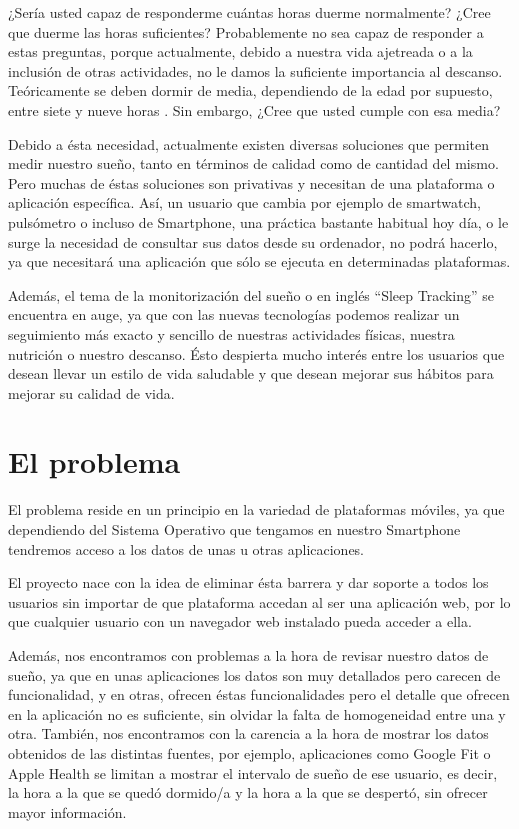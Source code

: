 \documentclass[11pt,openany]{book}
\begin{document}
¿Sería usted capaz de responderme cuántas horas duerme normalmente? ¿Cree que duerme las horas suficientes? Probablemente no sea capaz de responder a estas preguntas, porque actualmente, debido a nuestra vida ajetreada o a la inclusión de otras actividades, no le damos la suficiente importancia al descanso. Teóricamente se deben dormir de media, dependiendo de la edad por supuesto, entre siete y nueve horas \cite{1}. Sin embargo, ¿Cree que usted cumple con esa media?

Debido a ésta necesidad, actualmente existen diversas soluciones que permiten medir nuestro sueño, tanto en términos de calidad como de cantidad del mismo. Pero muchas de éstas soluciones son privativas y necesitan de una plataforma o aplicación específica. Así, un usuario que cambia por ejemplo de smartwatch, pulsómetro o incluso de Smartphone, una práctica bastante habitual hoy día, o le surge la necesidad de consultar sus datos desde su ordenador, no podrá hacerlo, ya que necesitará una aplicación que sólo se ejecuta en determinadas plataformas. 

Además, el tema de la monitorización del sueño o en inglés ``Sleep Tracking'' se encuentra en auge, ya que con las nuevas tecnologías podemos realizar un seguimiento más exacto y sencillo de nuestras actividades físicas, nuestra nutrición o nuestro descanso. Ésto despierta mucho interés entre los usuarios que desean llevar un estilo de vida saludable y que desean mejorar sus hábitos para mejorar su calidad de vida. 

\section{El problema}

El problema reside en un principio en la variedad de plataformas móviles, ya que dependiendo del Sistema Operativo que tengamos en nuestro Smartphone tendremos acceso a los datos de unas u otras aplicaciones. 

El proyecto nace con la idea de eliminar ésta barrera y dar soporte a todos los usuarios sin importar de que plataforma accedan al ser una aplicación web, por lo que cualquier usuario con un navegador web instalado pueda acceder a ella.

Además, nos encontramos con problemas a la hora de revisar nuestro datos de sueño, ya que en unas aplicaciones los datos son muy detallados pero carecen de funcionalidad, y en otras, ofrecen éstas funcionalidades pero el detalle que ofrecen en la aplicación no es suficiente, sin olvidar la falta de homogeneidad entre una y otra. También, nos encontramos con la carencia a la hora de mostrar los datos obtenidos de las distintas fuentes, por ejemplo, aplicaciones como Google Fit o Apple Health se limitan a mostrar el intervalo de sueño de ese usuario, es decir, la hora a la que se quedó dormido/a y la hora a la que se despertó, sin ofrecer mayor información.
\end{document}
